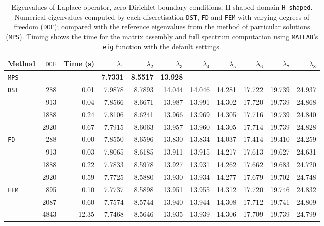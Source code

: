 %

\begin{table}[htbp]
  \centering
  {\scriptsize
  \begin{tabular}{lrrrrrrrrrr}
    \toprule
    Method & $\mathtt{DOF}$ & Time (s) & $\lambda_{1}$ & $\lambda_{2}$ & $\lambda_{3}$ & $\lambda_{4}$ & $\lambda_{5}$ & $\lambda_{6}$ & $\lambda_{7}$ & $\lambda_{8}$ \\
    \midrule
    \texttt{MPS} & --- & --- & \textbf{7.7331} & \textbf{8.5517} & \textbf{13.928} & --- & --- & --- & --- & --- \\
    \midrule
    \multirow{4}{*}{\texttt{DST}} & 288 & 0.01 & 7.9878 & 8.7893 & 14.044 & 14.046 & 14.281 & 17.722 & 19.739 & 24.937 \\
     & 913 & 0.04 & 7.8566 & 8.6671 & 13.987 & 13.991 & 14.302 & 17.720 & 19.739 & 24.868 \\
     & 1888 & 0.24 & 7.8106 & 8.6241 & 13.966 & 13.969 & 14.305 & 17.716 & 19.739 & 24.840 \\
     & 2920 & 0.67 & 7.7915 & 8.6063 & 13.957 & 13.960 & 14.305 & 17.714 & 19.739 & 24.828 \\
    \midrule
    \multirow{4}{*}{\texttt{FD}} & 288 & 0.00 & 7.8550 & 8.6596 & 13.830 & 13.834 & 14.037 & 17.414 & 19.410 & 24.259 \\
     & 913 & 0.03 & 7.8065 & 8.6185 & 13.911 & 13.915 & 14.217 & 17.613 & 19.627 & 24.631 \\
     & 1888 & 0.22 & 7.7833 & 8.5978 & 13.927 & 13.931 & 14.262 & 17.662 & 19.683 & 24.720 \\
     & 2920 & 0.59 & 7.7725 & 8.5880 & 13.930 & 13.934 & 14.277 & 17.679 & 19.702 & 24.748 \\
    \midrule
    \multirow{3}{*}{\texttt{FEM}} & 895 & 0.10 & 7.7737 & 8.5898 & 13.951 & 13.955 & 14.312 & 17.720 & 19.746 & 24.832 \\
     & 2087 & 0.60 & 7.7574 & 8.5744 & 13.940 & 13.944 & 14.308 & 17.712 & 19.741 & 24.809 \\
     & 4843 & 12.35 & 7.7468 & 8.5646 & 13.935 & 13.939 & 14.306 & 17.709 & 19.739 & 24.799 \\
    \bottomrule
  \end{tabular}}
  \caption{Eigenvalues of Laplace operator, zero Dirichlet boundary conditions, H-shaped domain \texttt{H\_shaped}. Numerical eigenvalues computed by each discretisation \texttt{DST}, \texttt{FD} and \texttt{FEM} with varying degrees of freedom ($\mathtt{DOF}$); compared with the reference eigenvalues from the method of particular solutions (\texttt{MPS}). Timing shows the time for the matrix assembly and full spectrum computation using \texttt{MATLAB}'s \lstinline{eig} function with the default settings.}
  \label{tab:eigenvalues_head_H_shaped}
\end{table}
